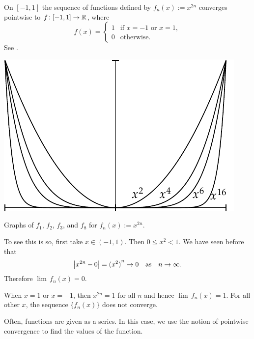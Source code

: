 \begin{example}
On $[-1,1]$ the sequence of functions defined by $f_n(x) := x^{2n}$
converges pointwise to $f \colon [-1,1] \to {\mathbb{R}}$, where
\begin{equation*}
f(x) =
\begin{cases}
1 & \text{if } x=-1 \text{ or } x=1, \\
0 & \text{otherwise.}
\end{cases}
\end{equation*}
See .

\begin{myfigureht}
\includegraphics{figures/x2nfig}
\caption{Graphs of $f_1$, $f_2$, $f_3$, and $f_8$ for $f_n(x) :=
x^{2n}$.\label{x2nfig}}
\end{myfigureht}

To see this is so, first take $x \in (-1,1)$.  Then 
$0 \leq x^2 < 1$.
We have seen before that
\begin{equation*}
\left\lvert {x^{2n} - 0} \right\rvert = {(x^2)}^n \to 0 \quad \text{as} \quad n \to \infty .
\end{equation*}
Therefore $\lim\,f_n(x) = 0$.

When $x = 1$ or $x=-1$, then $x^{2n} = 1$ for all $n$ and hence
$\lim\,f_n(x) = 1$.
For all other $x$, the sequence
$\{ f_n(x) \}$ does not converge.
\end{example}

Often, functions are given as a series.  In this case, we use
the notion of pointwise convergence to find the values of the function.

